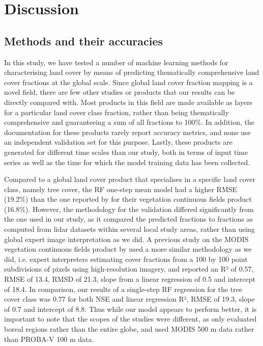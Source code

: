 \documentclass[review,authoryear,3p]{elsarticle}
\begin{document}
\section{Discussion}

\subsection{Methods and their accuracies}

In this study, we have tested a number of machine learning methods for characterising land cover by means of predicting thematically comprehensive land cover fractions at the global scale.
Since global land cover fraction mapping is a novel field, there are few other studies or products that our results can be directly compared with.
Most products in this field are made available as layers for a particular land cover class fraction, rather than being thematically comprehensive and guaranteeing a sum of all fractions to 100\%.
In addition, the documentation for these products rarely report accuracy metrics, and none use an independent validation set for this purpose.
Lastly, these products are generated for different time scales than our study, both in terms of input time series as well as the time for which the model training data has been collected.

Compared to a global land cover product that specialises in a specific land cover class, namely tree cover, the \gls{RF} one-step mean model had a higher \gls{RMSE} (19.2\%) than the one reported by \citet{sexton_global_2013} for their vegetation continuous fields product (16.8\%).
However, the methodology for the validation differed significantly from the one used in our study, as it compared the predicted fractions to fractions as computed from lidar datasets within several local study areas, rather than using global expert image interpretation as we did.
A previous study on the MODIS vegetation continuous fields product by \citet{montesano_modis_2009} used a more similar methodology as we did, i.e. expert interpreters estimating cover fractions from a 100 by 100 point subdivisions of pixels using high-resolution imagery, and reported an R² of 0.57, \gls{RMSE} of 13.4, RMSD of 21.3, slope from a linear regression of 0.5 and intercept of 18.4.
In comparison, our results of a single-step \gls{RF} regression for the tree cover class was 0.77 for both \gls{NSE} and linear regression R², \gls{RMSE} of 19.3, slope of 0.7 and intercept of 8.8.
Thus while our model appears to perform better, it is important to note that the scopes of the studies were different, as \citet{montesano_modis_2009} only evaluated boreal regions rather than the entire globe, and used MODIS 500 m data rather than PROBA-V 100 m data.
\end{document}
